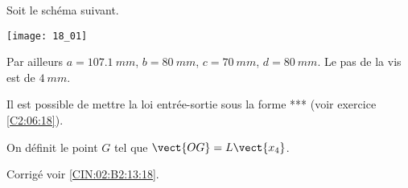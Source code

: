 \normalfalse \difficilefalse \tdifficiletrue
\correctionfalse


\setcounter{question}{0}
\ifcorrection
\else
{}
\fi

\ifprof
\else

Soit le schéma suivant. 
\begin{marginfigure}
\texttt{[image: 18\_01]}
\end{marginfigure}
\fi

Par ailleurs $a=\SI{107,1}{mm}$, $b=\SI{80}{mm}$, $c=\SI{70}{mm}$, $d=\SI{80}{mm}$. Le pas de la vis est de $\SI{4}{mm}$.


Il est possible de mettre la loi entrée-sortie sous la forme *** (voir exercice \ref{C2:06:18}).

On définit le point $G$ tel que $\vect{OG}=L\vect{x_4}$.

\ifprof
\else
\fi

\ifprof
\else
\fi


\ifprof
\else
\begin{flushright}
\footnotesize{Corrigé  voir \ref{CIN:02:B2:13:18}.}
\end{flushright}%
\fi